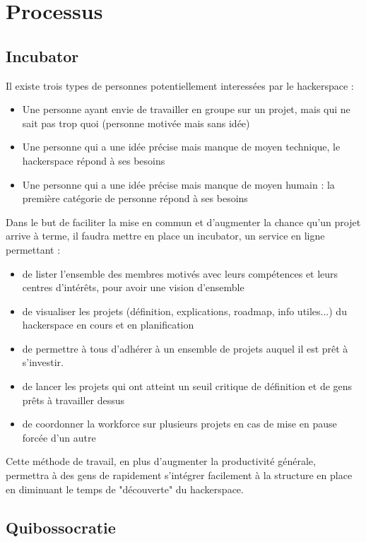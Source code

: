 \documentclass{article}
\begin{document}
\section{Processus}
\subsection{Incubator}

Il existe trois types de personnes potentiellement interessées par le hackerspace :
\begin{itemize}
\item Une personne ayant envie de travailler en groupe sur un projet, mais qui ne 
sait pas trop quoi (personne motivée mais sans idée)
\item Une personne qui a une idée précise mais manque de moyen technique, 
le hackerspace répond à ses besoins
\item Une personne qui a une idée précise mais manque de moyen humain : 
la première catégorie de personne répond à ses besoins
\end{itemize}

Dans le but de faciliter la mise en commun et d'augmenter la chance qu'un projet 
arrive à terme, il faudra mettre en place un incubator, un service en ligne permettant :
\begin{itemize}
\item de lister l'ensemble des membres motivés avec leurs compétences et leurs 
centres d'intérêts, pour avoir une vision d'ensemble
\item de visualiser les projets (définition, explications, roadmap, info utiles...) 
du hackerspace en cours et en planification
\item de permettre à tous d'adhérer à un ensemble de projets auquel il est prêt à s'investir.
\item de lancer les projets qui ont atteint un seuil critique de définition et 
de gens prêts à travailler dessus
\item de coordonner la workforce sur plusieurs projets en cas de mise en pause forcée d'un autre
\end{itemize}

Cette méthode de travail, en plus d'augmenter la productivité générale, permettra 
à des gens de rapidement s'intégrer facilement à la structure en place en diminuant 
le temps de "découverte" du hackerspace.

\subsection{Quibossocratie}
\end{document}
